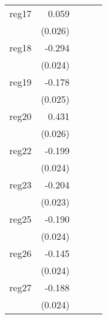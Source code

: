 {\begin{longtable}{l*{4}{D{.}{.}{-1}}}
\addlinespace
reg17       &       0.059\sym{*}  &                     &                     &                     \\
            &     (0.026)         &                     &                     &                     \\
\addlinespace
reg18       &      -0.294\sym{***}&                     &                     &                     \\
            &     (0.024)         &                     &                     &                     \\
\addlinespace
reg19       &      -0.178\sym{***}&                     &                     &                     \\
            &     (0.025)         &                     &                     &                     \\
\addlinespace
reg20       &       0.431\sym{***}&                     &                     &                     \\
            &     (0.026)         &                     &                     &                     \\
\addlinespace
reg22       &      -0.199\sym{***}&                     &                     &                     \\
            &     (0.024)         &                     &                     &                     \\
\addlinespace
reg23       &      -0.204\sym{***}&                     &                     &                     \\
            &     (0.023)         &                     &                     &                     \\
\addlinespace
reg25       &      -0.190\sym{***}&                     &                     &                     \\
            &     (0.024)         &                     &                     &                     \\
\addlinespace
reg26       &      -0.145\sym{***}&                     &                     &                     \\
            &     (0.024)         &                     &                     &                     \\
\addlinespace
reg27       &      -0.188\sym{***}&                     &                     &                     \\
            &     (0.024)         &                     &                     &                     \\

\end{longtable}}
